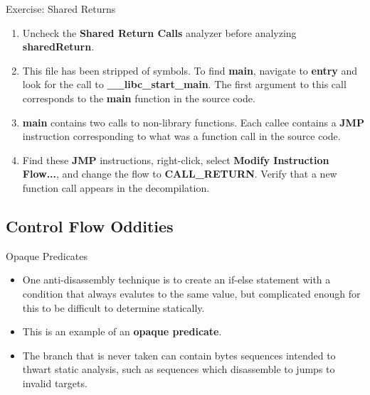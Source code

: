 \documentclass{beamer}
\begin{document}
\begin{frame}
\begin{block}{Exercise: Shared Returns}
\begin{enumerate}
\item Uncheck the \textbf{Shared Return Calls} analyzer before analyzing \textbf{sharedReturn}.
\item This file has been stripped of symbols.  To find \textbf{main}, navigate to \textbf{entry} and look for the call to \textbf{\_\_libc\_start\_main}. The first argument to this 
call corresponds to the \textbf{main} function in the source code.   
\item \textbf{main} contains two calls to non-library functions.  Each callee contains a \textbf{JMP} instruction corresponding to what was a function call in the source code. 
\item Find these \textbf{JMP} instructions, right-click, select \textbf{Modify Instruction Flow...}, and change the flow to \textbf{CALL\_RETURN}. Verify that a new function call appears 
in the decompilation.
\end{enumerate}
\end{block}
\end{frame}

\subsection{Control Flow Oddities}
\begin{frame}
\begin{block}{Opaque Predicates}
\begin{itemize}
\item One anti-disassembly technique is to create an if-else statement with a condition that always evalutes to the same value, but complicated enough for this to be difficult to 
determine statically.  
\item  This is an example of an \textbf{opaque predicate}.
\item  The branch that is never taken can contain bytes sequences intended to thwart static analysis, such as sequences which disassemble to jumps to invalid targets. 
\end{itemize}
\end{block}
\end{frame}
\end{document}

